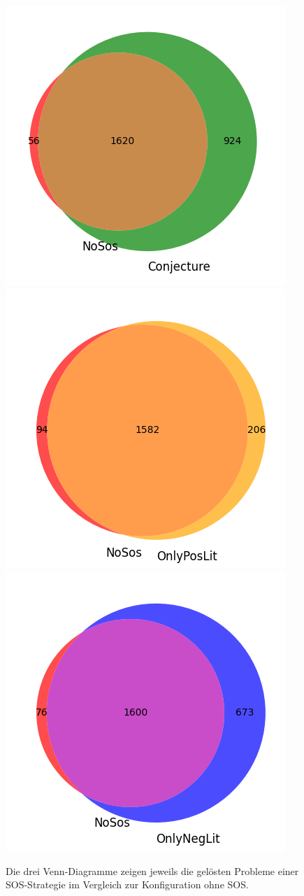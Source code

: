 		\begin{figure}
			\centering
			\includegraphics[width=0.3\linewidth]{images/Venn/venn2_sos1}
			\includegraphics[width=0.3\linewidth]{images/Venn/venn2_sos2}
			\includegraphics[width=0.3\linewidth]{images/Venn/venn2_sos3}
			\caption{Die drei Venn-Diagramme zeigen jeweils die gelösten Probleme einer SOS-Strategie im Vergleich zur Konfiguration ohne SOS.
			}
			\label{fig:venn2}
		\end{figure}
		
